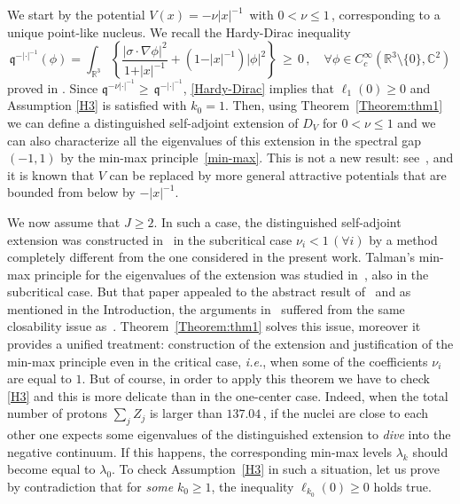 \documentclass[12pt,reqno]{amsart}
\newcommand{\R}{{\mathbb R}}
\newcommand{\C}{{\mathbb C}}
\newcommand{\be}[1]{\begin{equation}\label{#1}}
\newcommand{\ee}{\end{equation}}
\renewcommand{\(}{\left(}
\renewcommand{\)}{\right)}
\begin{document}
We start by the potential $V(x)=-\nu|x|^{-1}\,$ with $0<\nu\leq 1\,$, corresponding to a unique point-like nucleus. We recall the Hardy-Dirac inequality
\be{Hardy-Dirac}
\mathfrak{q}^{-|\cdot|^{-1}}(\phi)=\int_{\R^3}\left\{\frac{\vert \sigma\cdot\nabla\phi\vert^2}{1+\vert x\vert^{-1}}+\left(1-\vert x\vert^{-1}\right)\vert\phi\vert^2\right\}\,\geq\, 0
\,,\quad \forall \phi\in C^\infty_c(\R^3\setminus\{0\}, \C^2)\ee
proved in \cite{DES00a,DELV2004}. Since $\mathfrak{q}^{-\nu|\cdot|^{-1}}\geq\, \mathfrak{q}^{-|\cdot|^{-1}}$, \eqref{Hardy-Dirac} implies that $\ell_1(0)\geq 0$ and Assumption \eqref{H3} is satisfied with $k_0=1$. Then, using Theorem~\ref{Theorem:thm1} we can define a distinguished self-adjoint extension of $D_V$ for $0< \nu\le 1$ and we can also characterize all the eigenvalues of this extension in the spectral gap $(-1,1)$ by the min-max principle~\eqref{min-max}. This is not a new result: see~\cite{DES00a,EstLos-07,ELS19,SST20}, and it is known that $V$ can be replaced by more general attractive potentials that are bounded from below by $-|x|^{-1}$.\smallskip

We now assume that $J\geq 2$. In such a case, the distinguished self-adjoint extension was constructed in~\cite{Nen77,Klaus-80b} in the subcritical case $\nu_i<1\,(\forall i)$ by a method completely different from the one considered in the present work. Talman's min-max principle for the eigenvalues of the extension was studied in~\cite{ELS21}, also in the subcritical case. But that paper appealed to the abstract result of~\cite{DES06} and as mentioned in the Introduction, the arguments in~\cite{DES06} suffered from the same closability issue as~\cite{DES00a}. Theorem~\ref{Theorem:thm1} solves this issue, moreover it provides a unified treatment: construction of the extension and justification of the min-max principle even in the critical case, {\it i.e.}, when some of the coefficients $\nu_i$ are equal to $1$. But of course, in order to apply this theorem we have to check \eqref{H3} and this is more delicate than in the one-center case. Indeed, when the total number of protons $\sum_jZ_j$ is larger than $137.04\,$, if the nuclei are close to each other one expects some eigenvalues of the distinguished extension to {\it dive} into the negative continuum. If this happens, the corresponding min-max levels $\lambda_k$ should become equal to $\lambda_0$. To check Assumption~\eqref{H3} in such a situation, let us prove by contradiction that for {\it some} $k_0\geq 1$, the inequality $\ell_{k_0}(0)\geq 0$ holds true.
\end{document}
